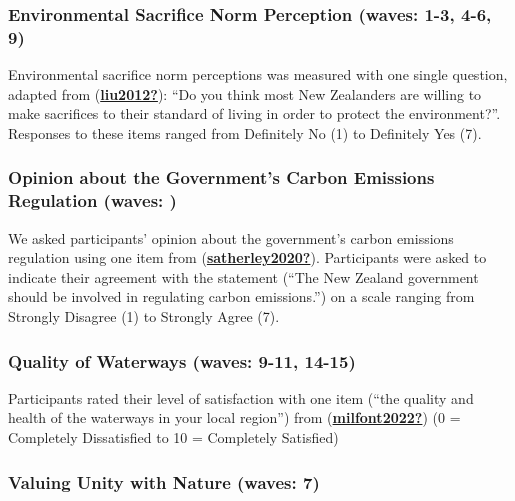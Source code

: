 \documentclass[
  singlecolumn]{report}
\begin{document}
\hypertarget{environmental-sacrifice-norm-perception-waves-1-3-4-6-9}{%
\subsubsection{Environmental Sacrifice Norm Perception (waves: 1-3, 4-6,
9)}\label{environmental-sacrifice-norm-perception-waves-1-3-4-6-9}}

Environmental sacrifice norm perceptions was measured with one single
question, adapted from
(\protect\hyperlink{ref-liu2012}{\textbf{liu2012?}}): ``Do you think
most New Zealanders are willing to make sacrifices to their standard of
living in order to protect the environment?''. Responses to these items
ranged from Definitely No (1) to Definitely Yes (7).

\hypertarget{opinion-about-the-governments-carbon-emissions-regulation-waves}{%
\subsubsection{Opinion about the Government's Carbon Emissions
Regulation (waves:
)}\label{opinion-about-the-governments-carbon-emissions-regulation-waves}}

We asked participants' opinion about the government's carbon emissions
regulation using one item from
(\protect\hyperlink{ref-satherley2020}{\textbf{satherley2020?}}).
Participants were asked to indicate their agreement with the statement
(``The New Zealand government should be involved in regulating carbon
emissions.'') on a scale ranging from Strongly Disagree (1) to Strongly
Agree (7).

\hypertarget{quality-of-waterways-waves-9-11-14-15}{%
\subsubsection{Quality of Waterways (waves: 9-11,
14-15)}\label{quality-of-waterways-waves-9-11-14-15}}

Participants rated their level of satisfaction with one item (``the
quality and health of the waterways in your local region'') from
(\protect\hyperlink{ref-milfont2022}{\textbf{milfont2022?}}) (0 =
Completely Dissatisfied to 10 = Completely Satisfied)

\hypertarget{valuing-unity-with-nature-waves-7}{%
\subsubsection{Valuing Unity with Nature (waves:
7)}\label{valuing-unity-with-nature-waves-7}}
\end{document}
